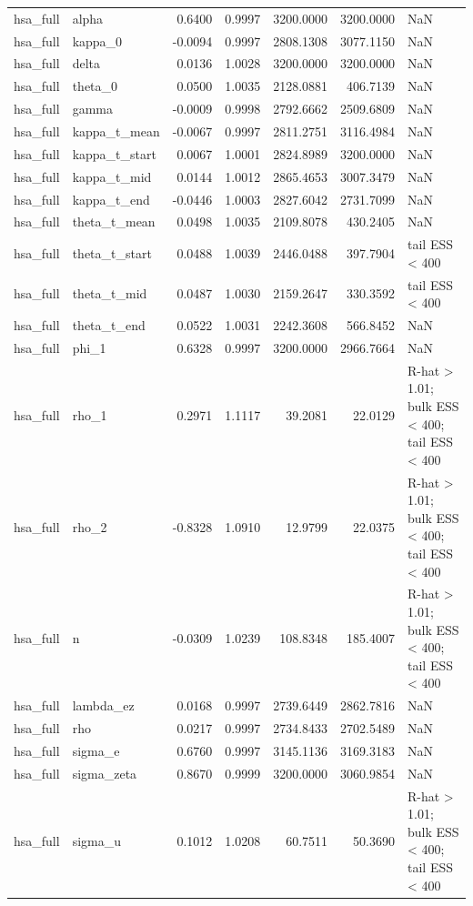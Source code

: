 \begin{tabular}{llrrrrl}
hsa\_full & alpha & 0.6400 & 0.9997 & 3200.0000 & 3200.0000 & NaN \\
hsa\_full & kappa\_0 & -0.0094 & 0.9997 & 2808.1308 & 3077.1150 & NaN \\
hsa\_full & delta & 0.0136 & 1.0028 & 3200.0000 & 3200.0000 & NaN \\
hsa\_full & theta\_0 & 0.0500 & 1.0035 & 2128.0881 & 406.7139 & NaN \\
hsa\_full & gamma & -0.0009 & 0.9998 & 2792.6662 & 2509.6809 & NaN \\
hsa\_full & kappa\_t\_mean & -0.0067 & 0.9997 & 2811.2751 & 3116.4984 & NaN \\
hsa\_full & kappa\_t\_start & 0.0067 & 1.0001 & 2824.8989 & 3200.0000 & NaN \\
hsa\_full & kappa\_t\_mid & 0.0144 & 1.0012 & 2865.4653 & 3007.3479 & NaN \\
hsa\_full & kappa\_t\_end & -0.0446 & 1.0003 & 2827.6042 & 2731.7099 & NaN \\
hsa\_full & theta\_t\_mean & 0.0498 & 1.0035 & 2109.8078 & 430.2405 & NaN \\
hsa\_full & theta\_t\_start & 0.0488 & 1.0039 & 2446.0488 & 397.7904 & tail ESS < 400 \\
hsa\_full & theta\_t\_mid & 0.0487 & 1.0030 & 2159.2647 & 330.3592 & tail ESS < 400 \\
hsa\_full & theta\_t\_end & 0.0522 & 1.0031 & 2242.3608 & 566.8452 & NaN \\
hsa\_full & phi\_1 & 0.6328 & 0.9997 & 3200.0000 & 2966.7664 & NaN \\
hsa\_full & rho\_1 & 0.2971 & 1.1117 & 39.2081 & 22.0129 & R-hat > 1.01; bulk ESS < 400; tail ESS < 400 \\
hsa\_full & rho\_2 & -0.8328 & 1.0910 & 12.9799 & 22.0375 & R-hat > 1.01; bulk ESS < 400; tail ESS < 400 \\
hsa\_full & n & -0.0309 & 1.0239 & 108.8348 & 185.4007 & R-hat > 1.01; bulk ESS < 400; tail ESS < 400 \\
hsa\_full & lambda\_ez & 0.0168 & 0.9997 & 2739.6449 & 2862.7816 & NaN \\
hsa\_full & rho & 0.0217 & 0.9997 & 2734.8433 & 2702.5489 & NaN \\
hsa\_full & sigma\_e & 0.6760 & 0.9997 & 3145.1136 & 3169.3183 & NaN \\
hsa\_full & sigma\_zeta & 0.8670 & 0.9999 & 3200.0000 & 3060.9854 & NaN \\
hsa\_full & sigma\_u & 0.1012 & 1.0208 & 60.7511 & 50.3690 & R-hat > 1.01; bulk ESS < 400; tail ESS < 400 \\

\end{tabular}
